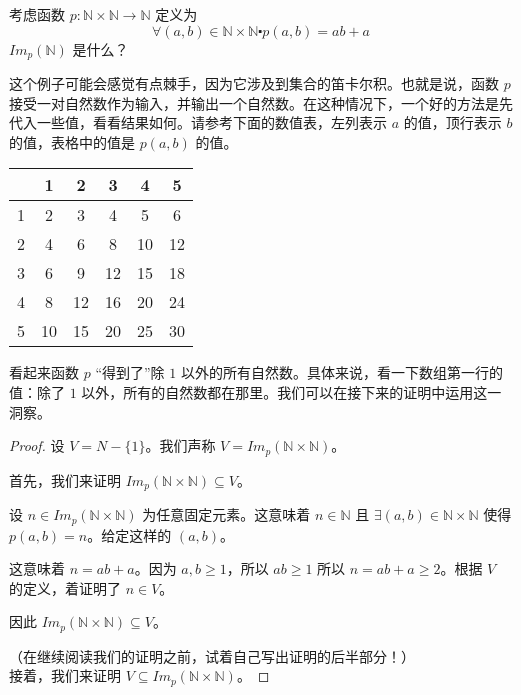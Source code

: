\begin{example}
    考虑函数 $p:\mathbb{N} \times \mathbb{N} \to \mathbb{N}$ 定义为
    \[\forall (a, b) \in \mathbb{N} \times \mathbb{N} \centerdot p(a, b) = ab + a\]
    $Im_p(\mathbb{N})$ 是什么？

    这个例子可能会感觉有点棘手，因为它涉及到集合的笛卡尔积。也就是说，函数 $p$ 接受一对自然数作为输入，并输出一个自然数。在这种情况下，一个好的方法是先代入一些值，看看结果如何。请参考下面的数值表，左列表示 $a$ 的值，顶行表示 $b$ 的值，表格中的值是 $p(a, b)$ 的值。

    \begin{center}
        \begin{tabular}{c|ccccc}
              &  1 &  2 &  3 &  4 &  5 \\
            \hline
            1 &  2 &  3 &  4 &  5 &  6 \\
            2 &  4 &  6 &  8 & 10 & 12 \\
            3 &  6 &  9 & 12 & 15 & 18 \\
            4 &  8 & 12 & 16 & 20 & 24 \\
            5 & 10 & 15 & 20 & 25 & 30 \\
        \end{tabular}
    \end{center}

    看起来函数 $p$ ``得到了''除 $1$ 以外的所有自然数。具体来说，看一下数组第一行的值：除了 $1$ 以外，所有的自然数都在那里。我们可以在接下来的证明中运用这一洞察。

    \begin{proof}
        设 $V = N - \{1\}$。我们声称 $V = Im_p(\mathbb{N} \times \mathbb{N})$。

        首先，我们来证明 $Im_p(\mathbb{N} \times \mathbb{N}) \subseteq V$。

        设 $n \in Im_p(\mathbb{N} \times \mathbb{N})$ 为任意固定元素。这意味着 $n \in \mathbb{N}$ 且 $\exists (a,b) \in \mathbb{N} \times \mathbb{N}$ 使得 $p(a,b)=n$。给定这样的 $(a,b)$。

        这意味着 $n=ab+a$。因为 $a,b \ge 1$，所以 $ab \ge 1$ 所以 $n = ab + a \ge 2$。根据 $V$ 的定义，着证明了 $n \in V$。

        因此 $Im_p(\mathbb{N} \times \mathbb{N}) \subseteq V$。

        （在继续阅读我们的证明之前，试着自己写出证明的后半部分！）\\

        接着，我们来证明 $V \subseteq Im_p(\mathbb{N} \times \mathbb{N})$。


\end{proof}
\end{example}
